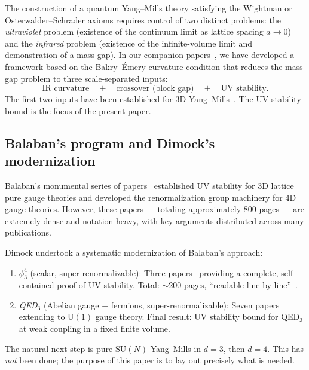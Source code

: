 \documentclass[11pt,a4paper]{article}
\theoremstyle{plain}
\theoremstyle{definition}
\theoremstyle{remark}
\newcommand{\SU}{\mathrm{SU}}
\newcommand{\U}{\mathrm{U}}
\begin{document}
The construction of a quantum Yang--Mills theory satisfying
the Wightman or Osterwalder--Schrader axioms requires control
of two distinct problems: the \emph{ultraviolet} problem
(existence of the continuum limit as lattice spacing $a \to 0$)
and the \emph{infrared} problem (existence of the infinite-volume
limit and demonstration of a mass gap). In our companion
papers~\cite{FontesGap,FontesUniform,FontesBBD,FontesEuclidean},
we have developed a framework based on the Bakry--\'Emery
curvature condition that reduces the mass gap problem to
three scale-separated inputs:
\begin{equation}\label{eq:three_regimes}
  \text{IR curvature} \quad + \quad
  \text{crossover (block gap)} \quad + \quad
  \text{UV stability.}
\end{equation}
The first two inputs have been established for
3D Yang--Mills~\cite{FontesGap,FontesUniform}.
The UV stability bound is the focus of the present paper.

\subsection{Balaban's program and Dimock's modernization}

Balaban's monumental series of papers~\cite{Bal84a,Bal84b,Bal85a,Bal85b,Bal85c,Bal85d,Bal85e,Bal87,Bal88a,Bal88b,Bal89}
established UV stability for 3D lattice pure gauge theories
and developed the renormalization group machinery for 4D
gauge theories. However, these papers --- totaling approximately
800 pages --- are extremely dense and notation-heavy, with
key arguments distributed across many publications.

Dimock undertook a systematic modernization of Balaban's approach:
\begin{enumerate}[label=(\roman*)]
  \item \emph{$\phi^4_3$} (scalar, super-renormalizable):
    Three papers~\cite{Dimock13a,Dimock13b,Dimock14}
    providing a complete, self-contained proof of UV stability.
    Total: $\sim$200 pages, ``readable line by
    line''~\cite{Adhikari}.
  \item \emph{QED$_3$} (Abelian gauge + fermions,
    super-renormalizable): Seven papers~\cite{Dimock02,Dimock04,Dimock15a,Dimock15b,Dimock18,Dimock20,Dimock22}
    extending to $\U(1)$ gauge theory.
    Final result: UV stability bound for QED$_3$
    at weak coupling in a fixed finite volume.
\end{enumerate}
The natural next step is pure $\SU(N)$ Yang--Mills in $d=3$,
then $d=4$. This has \emph{not} been done; the purpose
of this paper is to lay out precisely what is needed.
\end{document}
